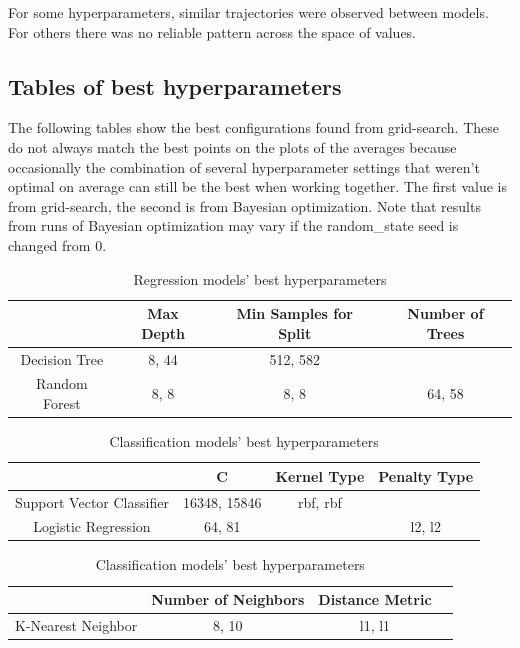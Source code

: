 \documentclass[12pt, letterpaper]{article}
\begin{document}
For some hyperparameters, similar trajectories were observed between models. For others there was no reliable pattern across the space of values.

\subsection{Tables of best hyperparameters}

The following tables show the best configurations found from grid-search. These do not always match the best points on the plots of the averages because occasionally the combination of several hyperparameter settings that weren't optimal on average can still be the best when working together. The first value is from grid-search, the second is from Bayesian optimization. Note that results from runs of Bayesian optimization may vary if the random\_state seed is changed from 0.

\begin{table}[H]
\centering
\caption{Regression models' best hyperparameters}
\label{reg_table}
\begin{tabular}{c|c|c|c} %
                & Max Depth     & Min Samples for Split & Number of Trees \\ \hline
Decision Tree   & 8, 44            & 512, 582                  &   \\
Random Forest   & 8, 8             & 8, 8                    & 64, 58 \\
\end{tabular}
\end{table}

\begin{table}[H]
\centering
\caption{Classification models' best hyperparameters}
\label{cls_table 1}
\begin{tabular}{c|c|c|c} %
                            & C         & Kernel Type   & Penalty Type \\ \hline
Support Vector Classifier   & 16348, 15846     & rbf, rbf \\
Logistic Regression         & 64, 81        &               & l2, l2 \\
\end{tabular}
\end{table}

\begin{table}[H]
\centering
\caption{Classification models' best hyperparameters}
\label{cls_table 2}
\begin{tabular}{c|c|c|c} %
                & Number of Neighbors & Distance Metric\\ \hline
K-Nearest Neighbor & 8, 10 & l1, l1 \\
\end{tabular}
\end{table}
\end{document}
